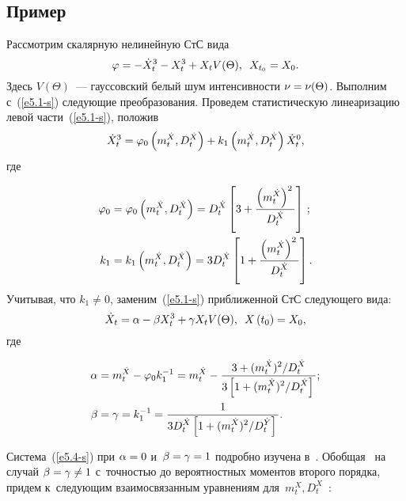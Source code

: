 \begin{multicols}{2}
\section{Пример}

Рассмотрим скалярную нелинейную СтС вида
\begin{equation}
 \varphi=-\dot X_t^3 -X_t^3 + X_t V(\Theta),\enskip X_{t_0}=X_0.
 \label{e5.1-s}
 \end{equation}
Здесь $V(\Theta)$~--- гауссовский белый шум ин\-тен\-сив\-ности $\nu\hm=\nu(\Theta)$. Выполним с~(\ref{e5.1-s}) 
сле\-ду\-ющие преобразования. Проведем статистическую линеаризацию левой части~(\ref{e5.1-s}), положив
\begin{equation*}
\dot X_t^3 = \varphi_0 \left( m_t^{\dot X}, D_t^{\dot X}\right)+ 
k_{1} \left( m_t^{\dot X}, D_t^{\dot X}\right)\dot X_t^0,
\end{equation*}
где

\noindent
\begin{align*}
\varphi_0&=\varphi_0 \left( m_t^{\dot X}, D_t^{\dot X}\right)= D_t^{\dot X} 
\left[ 3 + \displaystyle\frac{\displaystyle \left( m_t^{\dot X}\right)^2\mathstrut}{\displaystyle D_t^{\dot X}\mathstrut}\right]\,;\\
   k_1 &= k_1 \left( m_t^{\dot X}, D_t^{\dot X}\right)= 
   3D_t^{\dot X} \left[ 1+\displaystyle\frac{\displaystyle \left( m_t^{\dot X}\right)^2\mathstrut}{\displaystyle D_t^{\dot X}\mathstrut}\right].
   \end{align*} %
Учитывая, что  $k_1 \ne 0$, заменим~(\ref{e5.1-s}) приближенной СтС следующего вида:
\begin{equation}
\dot X_t = \alpha - \beta X_t^3 + \gamma X_t V(\Theta), \enskip X\left(t_0\right) = X_0, 
\label{e5.4-s}
\end{equation}
где

\vspace*{-2pt}

\noindent
\begin{align*}
\alpha&= m_t^{\dot X} - \varphi_0 k_1^{-1} = m_t^{\dot X} - 
\displaystyle\frac{\displaystyle 3+( m_t^{\dot X})^2/ D_t^{\dot X}\mathstrut}{\displaystyle 3 \left[ 1+( m_t^{\dot X})^2/ D_t^{\dot X}\right]\mathstrut};\\
\beta&= \gamma=k_1^{-1}=  \displaystyle\frac{\displaystyle 1\mathstrut}{\displaystyle 3 D_t^{\dot X}\left[ 1+( m_t^{\dot X})^2/ D_t^{\dot Y}\right]\mathstrut}.
\end{align*}

Система~(\ref{e5.4-s}) при $\alpha\hm=0$ и~$\beta\hm=\gamma\hm=1$ подробно изуче\-на в~\cite{8-s, 10-s}. 
Обобщая~\cite{8-s, 10-s} на случай $\beta\hm= \gamma\hm \ne 1$ с~точ\-ностью до вероятностных 
моментов второго порядка, придем к~следующим взаимосвязанным уравнениям для~$m_t^X, D_t^X$~\cite{8-s}:


\end{multicols}
